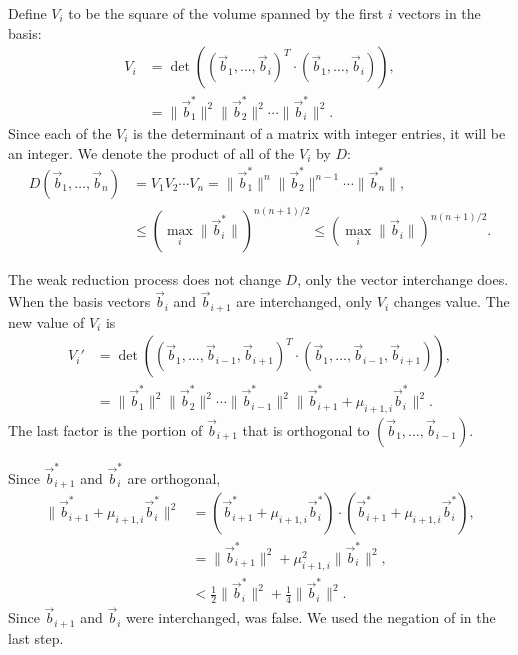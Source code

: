 Define $V_i$ to be the square of the volume spanned by the first $i$
vectors in the basis:
\[
\begin{aligned}
V_i & = \det ( (\vec{b}_1, \ldots, \vec{b}_i)^{T}\cdot (\vec{b}_1, \ldots,
\vec{b}_i)), \\
 & = \|\vec{b}^{\ast}_1\|^2 \|\vec{b}^{\ast}_2\|^2 \cdots
       \|\vec{b}^{\ast}_i\|^2.  
\end{aligned}
\]
Since each of the $V_i$ is the determinant of a matrix with integer
entries, it will be an integer.  We denote the product of all of the
$V_i$ by $D$:
\begin{equation} \label{Lat:DBound:Eq}
\begin{aligned}
D(\vec{b}_1, \ldots, \vec{b}_n) & = V_1 V_2 \cdots V_n
  = \|\vec{b}_1^{\ast}\|^n \|\vec{b}_2^{\ast}\|^{n-1}  \cdots \|\vec{b}_n^{\ast}\|, \\
  & \le (\max_i \|\vec{b}^{\ast}_i\|)^{n(n+1)/2}
    \le (\max_i \|\vec{b}_i\|)^{n(n+1)/2}.
\end{aligned}
\end{equation}

The weak reduction process does not change $D$, only the vector
interchange does.  When the basis vectors $\vec{b}_i$ and
$\vec{b}_{i+1}$ are interchanged, only $V_i$ changes value.  The new
value of $V_i$ is
\[
\begin{aligned}
V_i' & = \det ( (\vec{b}_1, \ldots, \vec{b}_{i-1}, \vec{b}_{i+1})^{T}\cdot 
  (\vec{b}_1, \ldots, \vec{b}_{i-1}, \vec{b}_{i+1})), \\
 & = \|\vec{b}^{\ast}_1\|^2 \|\vec{b}^{\ast}_2\|^2 \cdots \|\vec{b}^{\ast}_{i-1}\|^2
       \|\vec{b}^{\ast}_{i+1} + \mu_{i+1, i} \vec{b}^{\ast}_i\|^2.  
\end{aligned}
\]
The last factor is the portion of $\vec{b}_{i+1}$ that is orthogonal
to $(\vec{b}_1, \ldots, \vec{b}_{i-1})$.

Since $\vec{b}^{\ast}_{i+1}$ and $\vec{b}^{\ast}_{i}$ are orthogonal,
\[
\begin{aligned}
\|\vec{b}^{\ast}_{i+1} + \mu_{i+1, i} \vec{b}^{\ast}_i\|^2  & = 
(\vec{b}^{\ast}_{i+1} + \mu_{i+1, i} \vec{b}^{\ast}_i) \cdot
(\vec{b}^{\ast}_{i+1} + \mu_{i+1, i} \vec{b}^{\ast}_i), \\
&  =
\|\vec{b}^{\ast}_{i+1}\|^2 + \mu_{i+1, i}^2 \|\vec{b}^{\ast}_i\|^2, \\[3pt]
& \displaystyle < 
\frac{1}{2}\|\vec{b}^{\ast}_{i}\|^2 +
\frac{1}{4}\|\vec{b}^{\ast}_i\|^2.
\end{aligned}
\]
Since $\vec{b}_{i+1}$ and $\vec{b}_i$ were interchanged,
 was false.  We used the negation of
 in the last step.  

